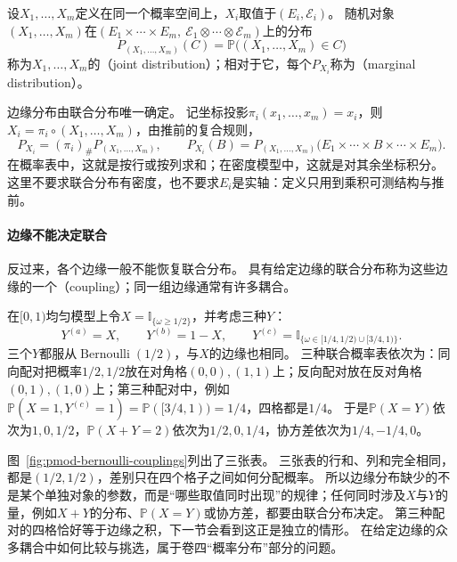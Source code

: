 \begin{definition}[联合分布与边缘分布]
\label{def:pmod-joint-distribution}
设$X_1,\dots,X_m$定义在同一个概率空间上，$X_i$取值于$(E_i,\mathcal E_i)$。
随机对象$(X_1,\dots,X_m)$在$(E_1\times\cdots\times E_m,\ \mathcal E_1\otimes\cdots\otimes\mathcal E_m)$上的分布
\[
  P_{(X_1,\dots,X_m)}(C)=\mathbb P\bigl((X_1,\dots,X_m)\in C\bigr)
\]
称为$X_1,\dots,X_m$的（joint distribution）；相对于它，每个$P_{X_i}$称为（marginal distribution）。
\end{definition}

边缘分布由联合分布唯一确定。
记坐标投影$\pi_i(x_1,\dots,x_m)=x_i$，则$X_i=\pi_i\circ(X_1,\dots,X_m)$，由推前的复合规则，
\[
  P_{X_i}=(\pi_i)_\#P_{(X_1,\dots,X_m)},\qquad
  P_{X_i}(B)=P_{(X_1,\dots,X_m)}\bigl(E_1\times\cdots\times B\times\cdots\times E_m\bigr).
\]
在概率表中，这就是按行或按列求和；在密度模型中，这就是对其余坐标积分。
这里不要求联合分布有密度，也不要求$E_i$是实轴：定义只用到乘积可测结构与推前。

\paragraph{边缘不能决定联合}
反过来，各个边缘一般不能恢复联合分布。
具有给定边缘的联合分布称为这些边缘的一个（coupling）；同一组边缘通常有许多耦合。

\begin{example}[相同边缘的三种配对]
\label{ex:pmod-bernoulli-couplings}
在$[0,1)$均匀模型上令$X=\mathbb I_{\{\omega\ge1/2\}}$，并考虑三种$Y$：
\[
  Y^{(a)}=X,\qquad Y^{(b)}=1-X,\qquad
  Y^{(c)}=\mathbb I_{\{\omega\in[1/4,1/2)\cup[3/4,1)\}}.
\]
三个$Y$都服从$\operatorname{Bernoulli}(1/2)$，与$X$的边缘也相同。
三种联合概率表依次为：同向配对把概率$1/2,1/2$放在对角格$(0,0),(1,1)$上；反向配对放在反对角格$(0,1),(1,0)$上；第三种配对中，例如$\mathbb P(X=1,Y^{(c)}=1)=\mathbb P([3/4,1))=1/4$，四格都是$1/4$。
于是$\mathbb P(X=Y)$依次为$1,0,1/2$，$\mathbb P(X+Y=2)$依次为$1/2,0,1/4$，协方差依次为$1/4,-1/4,0$。
\end{example}

图~\ref{fig:pmod-bernoulli-couplings}列出了三张表。
三张表的行和、列和完全相同，都是$(1/2,1/2)$，差别只在四个格子之间如何分配概率。
所以边缘分布缺少的不是某个单独对象的参数，而是“哪些取值同时出现”的规律；任何同时涉及$X$与$Y$的量，例如$X+Y$的分布、$\mathbb P(X=Y)$或协方差，都要由联合分布决定。
第三种配对的四格恰好等于边缘之积，下一节会看到这正是独立的情形。
在给定边缘的众多耦合中如何比较与挑选，属于卷四“概率分布”部分的问题。

